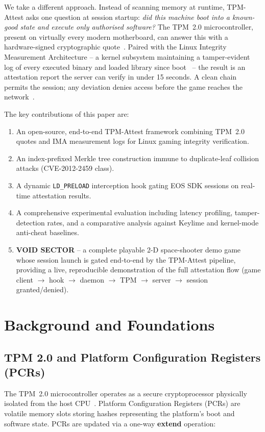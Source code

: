 \documentclass[11pt]{article}
\begin{document}
We take a different approach. Instead of scanning memory at runtime, TPM-Attest asks one question at session startup: \textit{did this machine boot into a known-good state and execute only authorised software?} The TPM~2.0 microcontroller, present on virtually every modern motherboard, can answer this with a hardware-signed cryptographic quote~\cite{tcg2018}. Paired with the Linux Integrity Measurement Architecture -- a kernel subsystem maintaining a tamper-evident log of every executed binary and loaded library since boot~\cite{sailer2004ima} -- the result is an attestation report the server can verify in under 15 seconds. A clean chain permits the session; any deviation denies access before the game reaches the network~\cite{rats2023}.

The key contributions of this paper are:
\begin{enumerate}[nosep]
  \item An open-source, end-to-end TPM-Attest framework combining TPM~2.0 quotes and IMA measurement logs for Linux gaming integrity verification.
  \item An index-prefixed Merkle tree construction immune to duplicate-leaf collision attacks (CVE-2012-2459 class).
  \item A dynamic \texttt{LD\_PRELOAD} interception hook gating EOS SDK sessions on real-time attestation results.
  \item A comprehensive experimental evaluation including latency profiling, tamper-detection rates, and a comparative analysis against Keylime and kernel-mode anti-cheat baselines.
  \item \textbf{VOID SECTOR} -- a complete playable 2-D space-shooter demo game whose session launch is gated end-to-end by the TPM-Attest pipeline, providing a live, reproducible demonstration of the full attestation flow (game client $\to$ hook $\to$ daemon $\to$ TPM $\to$ server $\to$ session granted/denied).
\end{enumerate}

\section{Background and Foundations}

\subsection{TPM 2.0 and Platform Configuration Registers (PCRs)}
The TPM~2.0 microcontroller operates as a secure cryptoprocessor physically isolated from the host CPU~\cite{tcg2018}. Platform Configuration Registers (PCRs) are volatile memory slots storing hashes representing the platform's boot and software state. PCRs are updated via a one-way \textbf{extend} operation:
\end{document}
